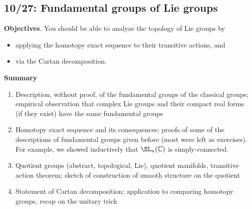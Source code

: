 \documentclass[reqno]{amsart} 
\begin{document}
\newpage
\subsection{10/27: Fundamental groups of Lie groups}
\label{sec:org6e185d7}
\textbf{Objectives}.  You should be able to analyze the topology of Lie
groups by
\begin{itemize}
\item applying the homotopy exact sequence to their transitive
actions, and
\item via the Cartan decomposition.
\end{itemize}

\textbf{Summary}
\begin{enumerate}
\item Description, without proof, of the fundamental groups of the
classical groups; empirical observation that complex Lie groups
and their compact real forms (if they exist) have the same
fundamental groups
\item Homotopy exact sequence and its consequences; proofs of some of the
descriptions
of fundamental groups given before (most were left as exercises).
For example, we showed inductively that \(\SL_n(\mathbb{C})\) is simply-connected.
\item Quotient groups (abstract, topological, Lie), quotient manifolds,
transitive action theorem; sketch of construction of smooth
structure on the quotient
\item Statement of Cartan decomposition; application to comparing
homotopy groups, recap on the unitary trick
\end{enumerate}
\end{document}
